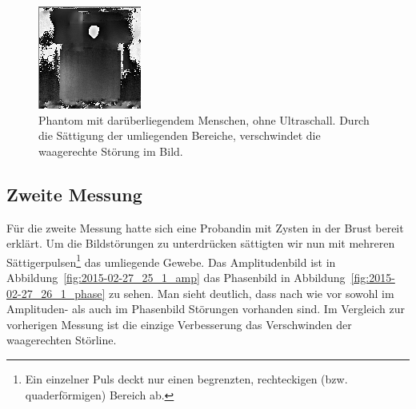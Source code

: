 \documentclass[
    11pt,
    ngerman
]{scrreprt}
\begin{document}
\begin{figure}[htbp]
    \centering
    \includegraphics[width=.4\textwidth]{Abbildungen/2014-12-11_37_1_phase_us_mensch_sat.png}
    \caption{%
        Phantom mit darüberliegendem Menschen, ohne Ultraschall. Durch die Sättigung der umliegenden Bereiche, verschwindet die waagerechte Störung im Bild.
    }
    \label{fig:phantom_mensch_sat}
\end{figure}

\subsection{Zweite Messung}

Für die zweite Messung hatte sich eine Probandin mit Zysten in der Brust
bereit erklärt. Um die Bildstörungen zu unterdrücken sättigten wir nun mit
mehreren Sättigerpulsen\footnote{Ein einzelner Puls deckt nur einen
begrenzten, rechteckigen (bzw. quaderförmigen) Bereich ab.} das umliegende
Gewebe. Das Amplitudenbild ist in Abbildung~\ref{fig:2015-02-27_25_1_amp} das
Phasenbild in Abbildung~\ref{fig:2015-02-27_26_1_phase} zu sehen. Man sieht
deutlich, dass nach wie vor sowohl im Amplituden- als auch im Phasenbild
Störungen vorhanden sind. Im Vergleich zur vorherigen Messung ist die einzige
Verbesserung das Verschwinden der waagerechten Störline.
\end{document}
